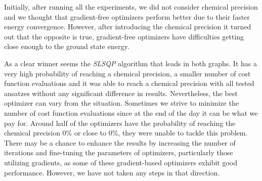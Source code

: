 Initially, after running all the experiments, we did not consider chemical precision and we thought that gradient-free optimizers perform better due to their faster energy convergence. However, after introducing the chemical precision it turned out that the opposite is true, gradient-free optimizers have difficulties getting close enough to the ground state energy.

As a clear winner seems the \textit{SLSQP} algorithm that leads in both graphs. It has a very high probability of reaching a chemical precision, a smaller number of cost function evaluations and it was able to reach a chemical precision with all tested ansatzes without any significant difference in results. Nevertheless, the best optimizer can vary from the situation. Sometimes we strive to minimize the number of cost function evaluations since at the end of the day it can be what we pay for. Around half of the optimizers have the probability of reaching the chemical precision 0\% or close to 0\%, they were unable to tackle this problem. There may be a chance to enhance the results by increasing the number of iterations and fine-tuning the parameters of optimizers, particularly those utilizing gradients, as some of these gradient-based optimizers exhibit good performance. However, we have not taken any steps in that direction.